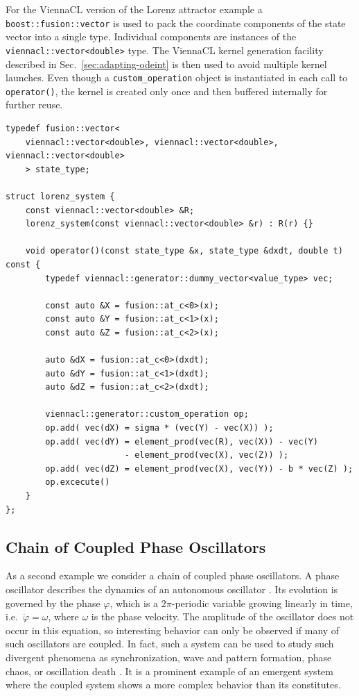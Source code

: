\documentclass[final]{siamltex}
\newcommand{\code}[1]{\lstinline$#1$}
\begin{document}
For the ViennaCL version of the Lorenz attractor example a
\code{boost::fusion::vector} is used to pack the coordinate components of the
state vector into a single type. Individual components are instances of the
\code{viennacl::vector<double>} type.  The ViennaCL kernel generation facility described in
Sec.~\ref{sec:adapting-odeint} is then used to avoid multiple kernel launches.
Even though a \code{custom_operation} object is instantiated in each call to \code{operator()},
the kernel is created only once and then buffered internally for further reuse.
\begin{lstlisting}
typedef fusion::vector<
    viennacl::vector<double>, viennacl::vector<double>, viennacl::vector<double>
    > state_type;

struct lorenz_system {
    const viennacl::vector<double> &R;
    lorenz_system(const viennacl::vector<double> &r) : R(r) {}

    void operator()(const state_type &x, state_type &dxdt, double t) const {
        typedef viennacl::generator::dummy_vector<value_type> vec;

        const auto &X = fusion::at_c<0>(x);
        const auto &Y = fusion::at_c<1>(x);
        const auto &Z = fusion::at_c<2>(x);

        auto &dX = fusion::at_c<0>(dxdt);
        auto &dY = fusion::at_c<1>(dxdt);
        auto &dZ = fusion::at_c<2>(dxdt);

        viennacl::generator::custom_operation op;
        op.add( vec(dX) = sigma * (vec(Y) - vec(X)) );
        op.add( vec(dY) = element_prod(vec(R), vec(X)) - vec(Y)
                        - element_prod(vec(X), vec(Z)) );
        op.add( vec(dZ) = element_prod(vec(X), vec(Y)) - b * vec(Z) );
        op.excecute()
    }
};
\end{lstlisting}



%
%
\subsection{Chain of Coupled Phase Oscillators}

As a second example we consider a chain of coupled phase
oscillators. A phase oscillator describes the dynamics of an
autonomous oscillator \cite{PhaseOscillator}. Its evolution is
governed by the phase $\varphi$, which is a $2\pi$-periodic variable growing linearly
in time, i.e.~$\dot{\varphi} = \omega$, where $\omega$ is the phase
velocity. The amplitude of the oscillator does not occur in this
equation, so interesting behavior can only be observed if many
of such oscillators are coupled. In fact, such a system can be used to
study such divergent phenomena as synchronization, wave and pattern
formation, phase chaos, or oscillation death
\cite{Kuramoto-84,Synchronization-Pikovsky}. It is a prominent example
of an emergent system where the coupled system shows a more complex
behavior than its constitutes.
\end{document}
